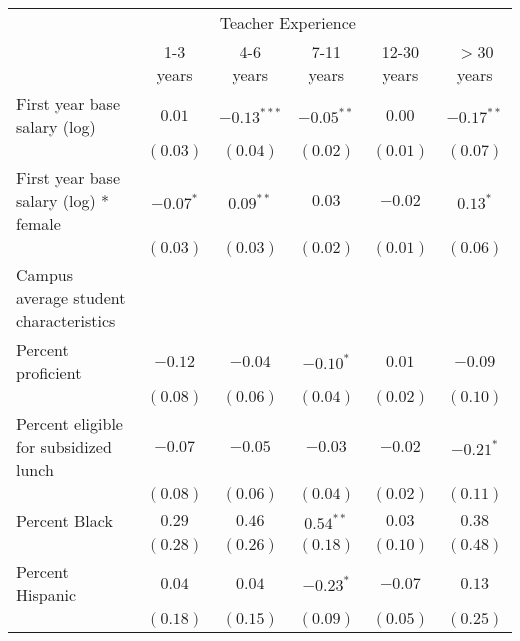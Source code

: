 \begin{table}
\begin{center}
\begin{adjustbox}{width=\textwidth,totalheight=0.85\textheight,keepaspectratio}
\begin{tabular}{l c c c c c }
\hline
 & \multicolumn{4}{c}{Teacher Experience} \\ \cline{2-6}
 & 1-3 years & 4-6 years & 7-11 years & 12-30 years & $>$30 years \\
\hline
First year base salary (log)                & $0.01$       & $-0.13^{***}$ & $-0.05^{**}$ & $0.00$       & $-0.17^{**}$ \\
                                            & $(0.03)$     & $(0.04)$      & $(0.02)$     & $(0.01)$     & $(0.07)$     \\
First year base salary (log) * female       & $-0.07^{*}$  & $0.09^{**}$   & $0.03$       & $-0.02$      & $0.13^{*}$   \\
                                            & $(0.03)$     & $(0.03)$      & $(0.02)$     & $(0.01)$     & $(0.06)$     \\
Campus average student characteristics      &              &               &              &              &              \\
\quad Percent proficient                    & $-0.12$      & $-0.04$       & $-0.10^{*}$  & $0.01$       & $-0.09$      \\
                                            & $(0.08)$     & $(0.06)$      & $(0.04)$     & $(0.02)$     & $(0.10)$     \\
\quad Percent eligible for subsidized lunch & $-0.07$      & $-0.05$       & $-0.03$      & $-0.02$      & $-0.21^{*}$  \\
                                            & $(0.08)$     & $(0.06)$      & $(0.04)$     & $(0.02)$     & $(0.11)$     \\
\quad Percent Black                         & $0.29$       & $0.46$        & $0.54^{**}$  & $0.03$       & $0.38$       \\
                                            & $(0.28)$     & $(0.26)$      & $(0.18)$     & $(0.10)$     & $(0.48)$     \\
\quad Percent Hispanic                      & $0.04$       & $0.04$        & $-0.23^{*}$  & $-0.07$      & $0.13$       \\
                                            & $(0.18)$     & $(0.15)$      & $(0.09)$     & $(0.05)$     & $(0.25)$     \\

\end{tabular}
\end{adjustbox}
\end{center}
\end{table}
